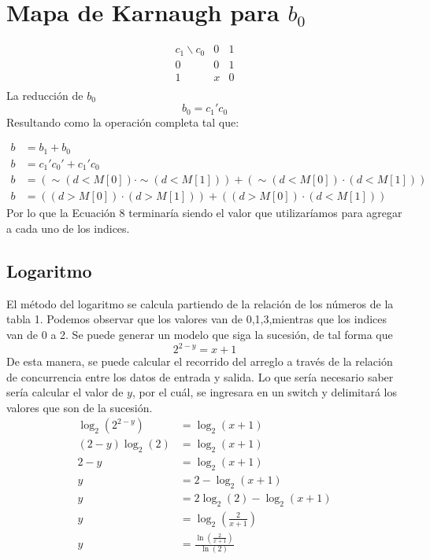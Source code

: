 \documentclass{article}
\begin{document}
\section*{Mapa de Karnaugh para \(b_0\)}
\[
\begin{array}{c|c|c}
c_1 \backslash c_0 & 0 & 1 \\
\hline
0 & 0 & 1 \\
1 & x & 0 \\
\end{array}
\]
La reducción de $b_0$
\begin{equation}
    b_0=c_1'c_0
\end{equation}
Resultando como la operación completa tal que:

\begin{align}
    b &= b_1 + b_0 \\
    b &= c_1'c_0' + c_1'c_0 \\
    b &= (\sim (d<M[0]) \cdot \sim (d<M[1])) + (\sim (d<M[0]) \cdot (d<M[1])) \\
    b &= ((d>M[0]) \cdot (d>M[1])) + ((d>M[0]) \cdot (d<M[1]))
\end{align}
Por lo que la Ecuación 8 terminaría siendo el valor que utilizaríamos para agregar a cada uno de los indices.
\subsection*{Logaritmo}
El método del logaritmo se calcula partiendo de la relación de los números de la tabla 1. Podemos observar que los valores van de 0,1,3,mientras que los indices van de 0 a 2. Se puede generar un modelo que siga la sucesión, de tal forma que
\begin{equation}
    2^{2-y}=x+1
\end{equation}
De esta manera, se puede calcular el recorrido del arreglo a través de la relación de concurrencia entre los datos de entrada y salida.
Lo que sería necesario saber sería calcular el valor de $y$, por el cuál, se ingresara en un switch y delimitará los valores que son de la sucesión.
\begin{align}
    \log_2(2^{2-y}) &= \log_2(x+1) \\
    (2-y)\log_2(2) &= \log_2(x+1) \\
    2 - y &= \log_2(x+1) \\
    y &= 2 - \log_2(x+1) \\
    y &= 2\log_2(2) - \log_2(x+1) \\
    y &= \log_2\left(\frac{2}{x+1}\right) \\
    y &= \frac{\ln\left(\frac{2}{x+1}\right)}{\ln(2)}
\end{align}
\end{document}

